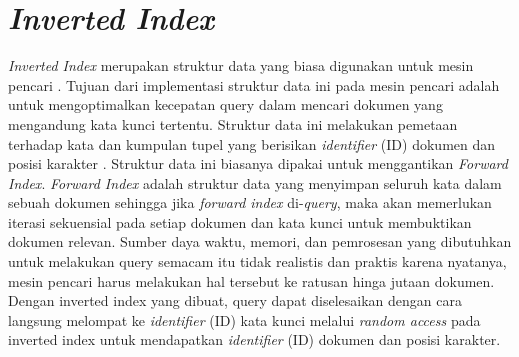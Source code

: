 \section{\textit{Inverted Index}}
\label{sec:invertedindex}

\textit{Inverted Index} merupakan struktur data yang biasa digunakan untuk mesin pencari \parencite{invertedindex2}. Tujuan dari implementasi struktur data ini pada mesin pencari adalah untuk mengoptimalkan kecepatan query dalam mencari dokumen yang mengandung kata kunci tertentu. Struktur data ini melakukan pemetaan terhadap kata dan kumpulan tupel yang berisikan \textit{identifier} (ID) dokumen dan posisi karakter \parencite{invertedindex}. Struktur data ini biasanya dipakai untuk menggantikan \textit{Forward Index}. \textit{Forward Index} adalah struktur data yang menyimpan seluruh kata dalam sebuah dokumen sehingga jika \textit{forward index} di-\textit{query}, maka akan memerlukan iterasi sekuensial pada setiap dokumen dan kata kunci untuk membuktikan dokumen relevan. Sumber daya waktu, memori, dan pemrosesan yang dibutuhkan untuk melakukan query semacam itu tidak realistis dan praktis karena nyatanya, mesin pencari harus melakukan hal tersebut ke ratusan hinga jutaan dokumen. Dengan inverted index yang dibuat, query dapat diselesaikan dengan cara langsung melompat ke \textit{identifier} (ID) kata kunci melalui \textit{random access} pada inverted index untuk mendapatkan \textit{identifier} (ID) dokumen dan posisi karakter.